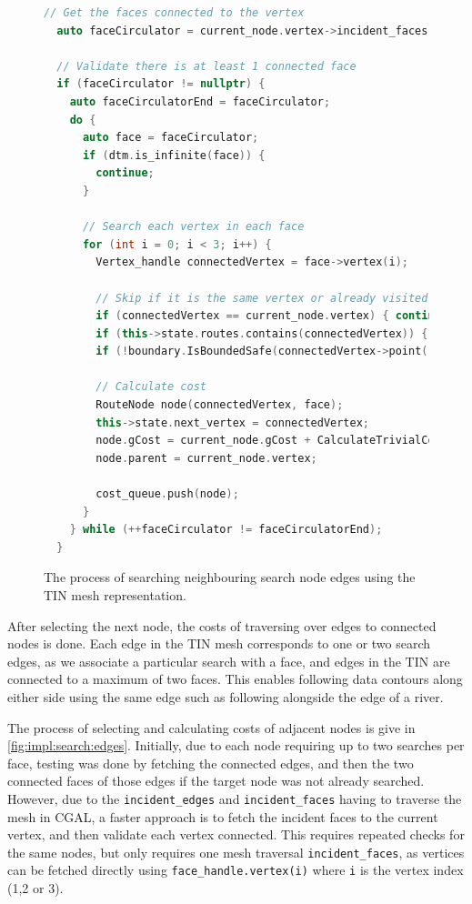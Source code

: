 \documentclass[12pt]{article}
\begin{document}
\begin{figure}[H]
  \centering
  \begin{lstlisting}[language=c++]
  // Get the faces connected to the vertex
  auto faceCirculator = current_node.vertex->incident_faces();

  // Validate there is at least 1 connected face
  if (faceCirculator != nullptr) {
    auto faceCirculatorEnd = faceCirculator;
    do {
      auto face = faceCirculator;
      if (dtm.is_infinite(face)) {
        continue;
      }

      // Search each vertex in each face
      for (int i = 0; i < 3; i++) {
        Vertex_handle connectedVertex = face->vertex(i);

        // Skip if it is the same vertex or already visited or out-of-bounds
        if (connectedVertex == current_node.vertex) { continue; }
        if (this->state.routes.contains(connectedVertex)) { continue; }
        if (!boundary.IsBoundedSafe(connectedVertex->point())) { continue; }

        // Calculate cost
        RouteNode node(connectedVertex, face);
        this->state.next_vertex = connectedVertex;
        node.gCost = current_node.gCost + CalculateTrivialCost(fm, this->state);
        node.parent = current_node.vertex;

        cost_queue.push(node);
      }
    } while (++faceCirculator != faceCirculatorEnd);
  }
\end{lstlisting}
  \caption{The process of searching neighbouring search node edges using the TIN mesh representation.}
  \label{fig:impl:search:edges}
\end{figure}

After selecting the next node, the costs of traversing over edges to connected nodes is done. Each edge in the TIN mesh corresponds to one or two search edges, as we associate a particular search with a face, and edges in the TIN are connected to a maximum of two faces. This enables following data contours along either side using the same edge such as following alongside the edge of a river.

The process of selecting and calculating costs of adjacent nodes is give in \autoref{fig:impl:search:edges}. Initially, due to each node requiring up to two searches per face, testing was done by fetching the connected edges, and then the two connected faces of those edges if the target node was not already searched. However, due to the \texttt{incident\_edges} and \texttt{incident\_faces} having to traverse the mesh in CGAL, a faster approach is to fetch the incident faces to the current vertex, and then validate each vertex connected. This requires repeated checks for the same nodes, but only requires one mesh traversal \texttt{incident\_faces}, as vertices can be fetched directly using \texttt{face\_handle.vertex(i)} where \texttt{i} is the vertex index (1,2 or 3).
\end{document}
